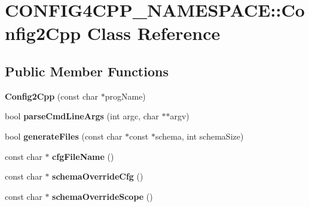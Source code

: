 \hypertarget{classCONFIG4CPP__NAMESPACE_1_1Config2Cpp}{\section{C\-O\-N\-F\-I\-G4\-C\-P\-P\-\_\-\-N\-A\-M\-E\-S\-P\-A\-C\-E\-:\-:Config2\-Cpp Class Reference}
\label{classCONFIG4CPP__NAMESPACE_1_1Config2Cpp}
}
\subsection*{Public Member Functions}
\begin{DoxyCompactItemize}
\item 
\hypertarget{classCONFIG4CPP__NAMESPACE_1_1Config2Cpp_abcfb558647a328e709fd184feb85abd3}{{\bfseries Config2\-Cpp} (const char $\ast$prog\-Name)}\label{classCONFIG4CPP__NAMESPACE_1_1Config2Cpp_abcfb558647a328e709fd184feb85abd3}

\item 
\hypertarget{classCONFIG4CPP__NAMESPACE_1_1Config2Cpp_ad083a2e806c5ff95b75b2bf520b3997a}{bool {\bfseries parse\-Cmd\-Line\-Args} (int argc, char $\ast$$\ast$argv)}\label{classCONFIG4CPP__NAMESPACE_1_1Config2Cpp_ad083a2e806c5ff95b75b2bf520b3997a}

\item 
\hypertarget{classCONFIG4CPP__NAMESPACE_1_1Config2Cpp_a9c84ad99a97b335e701f2b4bb7479c90}{bool {\bfseries generate\-Files} (const char $\ast$const $\ast$schema, int schema\-Size)}\label{classCONFIG4CPP__NAMESPACE_1_1Config2Cpp_a9c84ad99a97b335e701f2b4bb7479c90}

\item 
\hypertarget{classCONFIG4CPP__NAMESPACE_1_1Config2Cpp_a9a51831d179cd72f467bb8ef91ee0281}{const char $\ast$ {\bfseries cfg\-File\-Name} ()}\label{classCONFIG4CPP__NAMESPACE_1_1Config2Cpp_a9a51831d179cd72f467bb8ef91ee0281}

\item 
\hypertarget{classCONFIG4CPP__NAMESPACE_1_1Config2Cpp_a98814e664226758fc213b8befd81e21d}{const char $\ast$ {\bfseries schema\-Override\-Cfg} ()}\label{classCONFIG4CPP__NAMESPACE_1_1Config2Cpp_a98814e664226758fc213b8befd81e21d}

\item 
\hypertarget{classCONFIG4CPP__NAMESPACE_1_1Config2Cpp_aedf47578fff7433024dac61ef374c0ec}{const char $\ast$ {\bfseries schema\-Override\-Scope} ()}\label{classCONFIG4CPP__NAMESPACE_1_1Config2Cpp_aedf47578fff7433024dac61ef374c0ec}


\end{DoxyCompactItemize}
